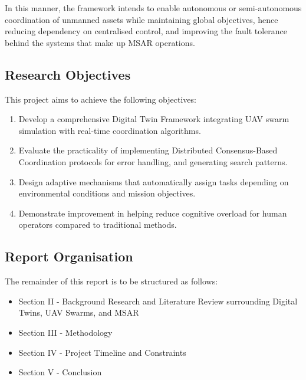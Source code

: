 In this manner, the framework intends to enable autonomous or semi-autonomous coordination of unmanned assets while maintaining global objectives, hence reducing dependency on centralised control, and improving the fault tolerance behind the systems that make up MSAR operations.

\subsection{Research Objectives}\label{subsec:research-objectives}
This project aims to achieve the following objectives:
\begin{enumerate}
    \item Develop a comprehensive Digital Twin Framework integrating UAV swarm simulation with real-time coordination algorithms.
    \item Evaluate the practicality of implementing Distributed Consensus-Based Coordination protocols for error handling, and generating search patterns.
    \item Design adaptive mechanisms that automatically assign tasks depending on environmental conditions and mission objectives.
    \item Demonstrate improvement in helping reduce cognitive overload for human operators compared to traditional methods.
\end{enumerate}

\subsection{Report Organisation}\label{subsec:report-organization}
The remainder of this report is to be structured as follows:
\begin{itemize}
    \item Section II - Background Research and Literature Review surrounding Digital Twins, UAV Swarms, and MSAR
    \item Section III - Methodology
    \item Section IV - Project Timeline and Constraints
    \item Section V - Conclusion
\end{itemize}

